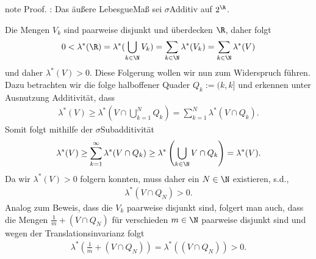 \documentclass[letterpaper,10pt,german]{jupyterBook}
\begin{document}
\begin{sphinxadmonition}{note}
\sphinxAtStartPar
Proof. : Das äußere Lebesgue\sphinxhyphen{}Maß sei \(\sigma\)\sphinxhyphen{}Additiv auf \(2^{\R}\).

\sphinxAtStartPar
Die Mengen \(V_k\) sind paarweise disjunkt und überdecken \(\R\), daher folgt
\begin{equation*}
\begin{split}0<\lambda^\ast(\R) = \lambda^\ast(\bigcup_{k\in\N} V_k) = \sum_{k\in\N} \lambda^\ast(V_k) = \sum_{k\in\N} \lambda^\ast(V)\end{split}
\end{equation*}
\sphinxAtStartPar
und daher \(\lambda^\ast(V)>0\). Diese Folgerung wollen wir nun zum Widerspruch führen. Dazu betrachten wir die folge halboffener Quader \(Q_k:=(k,k]\) und erkennen unter Ausnutzung  Additivität, dass
\begin{equation*}
\begin{split}\lambda^\ast(V) \geq \lambda^\ast\left(V \cap \bigcup_{k=1}^N Q_k\right) = 
\sum_{k=1}^N \lambda^\ast(V\cap Q_k).\end{split}
\end{equation*}
\sphinxAtStartPar
Somit folgt mithilfe der \(\sigma\)\sphinxhyphen{}Subadditivität
\begin{equation*}
\begin{split}\lambda^\ast(V) \geq \sum_{k=1}^\infty \lambda^\ast(V\cap Q_k) \geq
\lambda^\ast\left(\bigcup_{k\in\N} V\cap Q_k\right) = \lambda^\ast(V).\end{split}
\end{equation*}
\sphinxAtStartPar
Da wir \(\lambda^\ast(V)>0\) folgern konnten, muss daher ein \(N\in\N\) existieren, s.d.,
\begin{equation*}
\begin{split}\lambda^\ast(V\cap Q_N) >0.\end{split}
\end{equation*}
\sphinxAtStartPar
Analog zum Beweis, dass die \(V_k\) paarweise disjunkt sind, folgert man auch, dass die Mengen \(\frac{1}{m}+(V\cap Q_N)\) für verschieden \(m\in\N\) paarweise disjunkt sind und wegen der Translationsinvarianz folgt
\begin{equation*}
\begin{split}\lambda^\ast(\frac{1}{m}+(V\cap Q_N)) = \lambda^\ast((V\cap Q_N)) >0.\end{split}
\end{equation*}
\sphinxAtStartPar

\end{sphinxadmonition}
\end{document}
